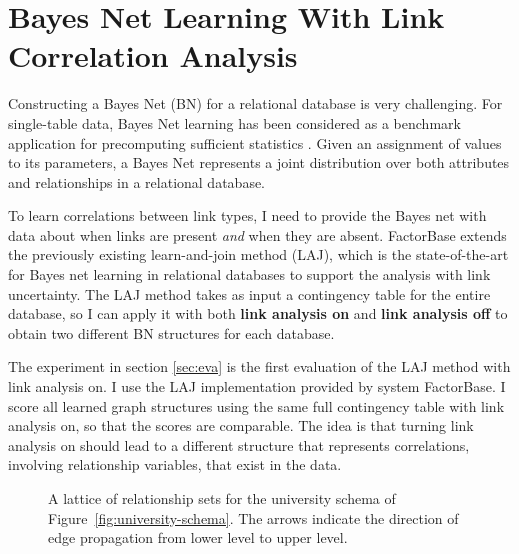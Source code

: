 \documentclass{sfuthesis}
\begin{document}
\section{Bayes Net Learning With Link Correlation Analysis}
Constructing a Bayes Net (BN) for a relational database is very challenging. For single-table data, Bayes Net learning has been considered as a benchmark application for precomputing sufficient statistics \cite{Moore1998,lv2012}. 
Given an assignment of values to its parameters, a Bayes Net represents a joint distribution over both attributes and relationships in a relational database. 

To learn correlations between link types, I  need to provide the Bayes net with data about when links are present {\em and} when they are absent. 
FactorBase extends the previously existing learn-and-join method (LAJ), which is the state-of-the-art for Bayes net learning in relational databases \cite{Schulte2012} to support the analysis with link uncertainty. The LAJ method takes as input a contingency table for the entire database, so I  can apply it with both \textbf{link analysis on} and \textbf{link analysis off} to obtain two different BN structures for each database. 

The experiment in section \ref{sec:eva} is the first evaluation of the LAJ method with link analysis on. I use the LAJ implementation provided by system FactorBase. I  score all learned graph structures using the same full contingency table with link analysis on, so that the scores are comparable. The idea is that turning link analysis on should lead to a different structure that represents correlations, involving relationship variables, that exist in the data.

\begin{figure}[!h]
\begin{center}
\caption{A lattice of relationship sets for the university schema of Figure~\ref{fig:university-schema}. The arrows indicate the direction of edge propagation from lower level to upper level. \label{fig:big-lattice1}
}
\end{center}
\end{figure}
\end{document}
